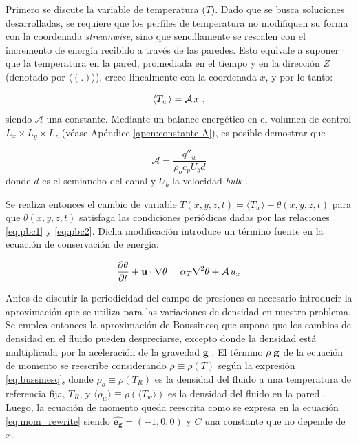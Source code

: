 Primero se discute la variable de temperatura ($T$). Dado que se busca soluciones desarrolladas, se requiere que  los perfiles de temperatura no modifiquen su forma con la coordenada \textit{streamwise}, sino que sencillamente se rescalen con el incremento de energía recibido a través de las paredes. Esto equivale a suponer que la temperatura en la pared, promediada en el tiempo y en la dirección $Z$ (denotado por $\langle (\text{.})\rangle$), crece linealmente con la coordenada $x$, y por lo tanto: 

$$
\langle T_w \rangle = \mathcal{A} \hspace{0.5mm} x \text{ ,}
$$
siendo $\mathcal{A}$ una constante. Mediante un balance energético en el volumen de control $L_x \times L_y \times L_z$ (véase Apéndice \ref{apen:constante-A}), es posible demostrar que

$$\mathcal{A} = \frac{q''_w}{\rho_o  c_p U_b d} $$ 
donde $d$ es el semiancho del canal y $U_b$ la velocidad \textit{bulk} \cite{pope2001turbulent}.

Se realiza entonces el cambio de variable $T(x,y,z,t) = \langle T_w \rangle - \theta(x,y,z,t)$ para que $\theta(x,y,z,t)$ satisfaga las condiciones periódicas dadas por las relaciones \ref{eq:pbc1} y \ref{eq:pbc2}. Dicha modificación introduce un término fuente en la ecuación de conservación de energía:

\begin{equation}
\frac{ \partial \theta }{ \partial t } + \mathbf{u} \cdot \nabla \theta = \alpha_{T} \nabla^2 \theta + \mathcal{A} \hspace{0.5mm} u_x 
\label{eq:energy_pcb_source}
\end{equation}

Antes de discutir la periodicidad del campo de presiones es necesario introducir la aproximación que se utiliza para las variaciones de densidad en nuestro problema. Se emplea entonces la aproximación de Boussinesq que supone que los cambios de densidad en el fluido pueden despreciarse, excepto donde la densidad está multiplicada por la aceleración de la gravedad $\mathbf{g}$ \cite{kundu}. El término $\rho \hspace{1mm} \mathbf{g}$ de la ecuación de momento se reescribe considerando $\rho \equiv \rho(T)$ según la expresión \ref{eq:bussinesq}, donde $\rho_o \equiv \rho(T_R)$ es la densidad del fluido a una temperatura de referencia fija, $T_R$, y $ \langle \rho_w \rangle \equiv \rho(\langle T_w \rangle)$ es la densidad del fluido en la pared \cite{incropera}. Luego, la ecuación de momento queda reescrita como se expresa en la ecuación \ref{eq:mom_rewrite} siendo $\mathbf{\hat{e_g}}=(-1,0,0)$ y $C$ una constante que no depende de $x$.


